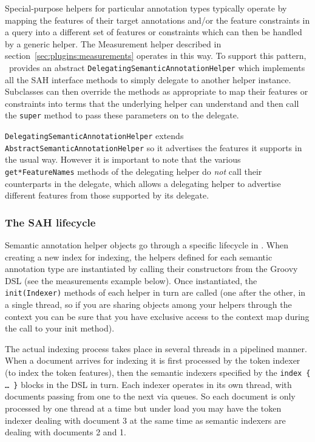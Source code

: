 Special-purpose helpers for particular annotation types typically operate by
mapping the features of their target annotations and/or the feature constraints
in a query into a different set of features or constraints which can then be
handled by a generic helper.  The Measurement helper described in
section~\ref{sec:plugins:measurements} operates in this way.  To support
this pattern, \Mimir\ provides an abstract
{\tt DelegatingSemanticAnnotationHelper} which implements all the SAH interface
methods to simply delegate to another helper instance.  Subclasses can then
override the methods as appropriate to map their features or constraints into
terms that the underlying helper can understand and then call the {\tt super}
method to pass these parameters on to the delegate.

{\tt DelegatingSemanticAnnotationHelper} extends
{\tt AbstractSemanticAnnotationHelper} so it advertises the features it
supports in the usual way.  However it is important to note that the various
\verb|get*FeatureNames| methods of the delegating helper do {\em not} call
their counterparts in the delegate, which allows a delegating helper to
advertise different features from those supported by its delegate.

\subsubsection{The SAH lifecycle}

Semantic annotation helper objects go through a specific lifecycle in \Mimir.
When creating a new index for indexing, the helpers defined for each semantic
annotation type are instantiated by calling their constructors
from the Groovy DSL (see the measurements example below).
Once instantiated, the {\tt init(Indexer)} methods of each helper in turn are
called (one after the other, in a single thread, so if you are sharing objects
among your helpers through the context you can be sure that you have exclusive
access to the context map during the call to your init method).

The actual indexing process takes place in several threads in a pipelined
manner.  When a document arrives for indexing it is first processed by the
token indexer (to index the token features), then the semantic indexers
specified by the {\tt index \{ \ldots\ \}} blocks in the DSL in turn.  Each
indexer operates in its own thread, with documents passing from one to the next
via queues.  So each document is only processed by one thread at a time but
under load you may have the token indexer dealing with document 3 at the same
time as semantic indexers are dealing with documents 2 and 1.

